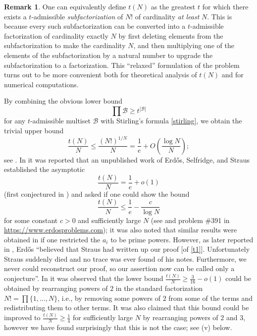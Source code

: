 \documentclass[10pt,a4paper,reqno]{amsart}
\numberwithin{equation}{section}
\theoremstyle{plain}
\theoremstyle{definition}
\newtheorem{remark}[remark]{Remark}
\newcommand\tuple{{\mathcal B}}
\begin{document}
\begin{remark}\label{subfac}  One can equivalently define $t(N)$ as the greatest $t$ for which there exists a $t$-admissible \emph{subfactorization} of $N!$ of cardinality \emph{at least} $N$.  This is because every such subfactorization can be converted into a $t$-admissible factorization of cardinality exactly $N$ by first deleting elements from the subfactorization to make the cardinality $N$, and then multiplying one of the elements of the subfactorization by a natural number to upgrade the subfactorization to a factorization.  This ``relaxed'' formulation of the problem turns out to be more convenient both for theoretical analysis of $t(N)$ and for numerical computations.
\end{remark}

By combining the obvious lower bound
\begin{equation}\label{obvious}
 \prod \tuple \geq t^{|\tuple|}
\end{equation}
for any $t$-admissible multiset $\tuple$ with Stirling's formula \eqref{stirling}, we obtain the trivial upper bound
\begin{equation}\label{trivial} \frac{t(N)}{N} \leq \frac{(N!)^{1/N}}{N} = \frac{1}{e} + O\left( \frac{\log N}{N}\right);
\end{equation}
see .  In \cite[p.75]{erdos-graham} it was reported that an unpublished work of Erd\H{o}s, Selfridge, and Straus established the asymptotic
\begin{equation}\label{t1}
  \frac{t(N)}{N} = \frac{1}{e} + o(1)
\end{equation}
(first conjectured in \cite{erdos-71}) and asked if one could show the bound
\begin{equation}\label{Tbound}
   \frac{t(N)}{N} \leq \frac{1}{e} - \frac{c}{\log N}
\end{equation}
for some constant $c>0$ and sufficiently large $N$ (see \cite[Section B22, p.\ 122--123]{guy} and problem {\#}391 in \url{https://www.erdosproblems.com}); it was also noted that similar results were obtained in \cite{algr77} if one restricted the $a_i$ to be prime powers.  However, as later reported in \cite{erdos-96}, Erd\H{o}s ``believed that Straus had written up our proof [of \eqref{t1}]. Unfortunately Straus suddenly died and no trace was ever found of his notes. Furthermore, we never could reconstruct our proof, so our assertion now can be called only a conjecture''.   In \cite{guy-selfridge} it was observed that the lower bound $\frac{t(N)}{N} \geq \frac{3}{16}-o(1)$ could be obtained by rearranging powers of $2$ in the standard factorization $N! = \prod \{1,\dots,N\}$, i.e., by removing some powers of $2$ from some of the terms and redistributing them to other terms.  It was also claimed that this bound could be improved to $\frac{t(N)}{N} \geq \frac{1}{4}$ for sufficiently large $N$ by rearranging powers of $2$ and $3$, however we have found surprisingly that this is not the case; see (v) below.
\end{document}
